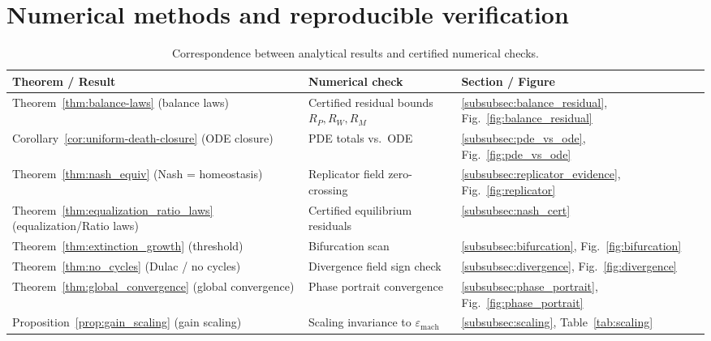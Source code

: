 \documentclass[pdflatex,sn-mathphys-ay]{sn-jnl}
\theoremstyle{thmstyleone}
\theoremstyle{definition}
\theoremstyle{remark}
\begin{document}
\section{Numerical methods and reproducible verification}
\label{sec:numerics}


\begin{table}[h]
\centering
\caption{Correspondence between analytical results and certified numerical checks.}
\label{tab:evidence_chain}
\begin{tabular}{lll}
\hline
\textbf{Theorem / Result} & \textbf{Numerical check} & \textbf{Section / Figure} \\
\hline
Theorem~\ref{thm:balance-laws} (balance laws) &
  Certified residual bounds $R_P,R_W,R_M$ &
  \ref{subsubsec:balance_residual}, Fig.~\ref{fig:balance_residual} \\
Corollary~\ref{cor:uniform-death-closure} (ODE closure) &
  PDE totals vs.\ ODE &
  \ref{subsubsec:pde_vs_ode}, Fig.~\ref{fig:pde_vs_ode} \\
Theorem~\ref{thm:nash_equiv} (Nash = homeostasis) &
  Replicator field zero-crossing &
  \ref{subsubsec:replicator_evidence}, Fig.~\ref{fig:replicator} \\
Theorem~\ref{thm:equalization_ratio_laws} (equalization/Ratio laws) &
  Certified equilibrium residuals &
  \ref{subsubsec:nash_cert} \\
Theorem~\ref{thm:extinction_growth} (threshold) &
  Bifurcation scan &
  \ref{subsubsec:bifurcation}, Fig.~\ref{fig:bifurcation} \\
Theorem~\ref{thm:no_cycles} (Dulac / no cycles) &
  Divergence field sign check &
  \ref{subsubsec:divergence}, Fig.~\ref{fig:divergence} \\
Theorem~\ref{thm:global_convergence} (global convergence) &
  Phase portrait convergence &
  \ref{subsubsec:phase_portrait}, Fig.~\ref{fig:phase_portrait} \\
Proposition~\ref{prop:gain_scaling} (gain scaling) &
  Scaling invariance to $\varepsilon_{\mathrm{mach}}$ &
  \ref{subsubsec:scaling}, Table~\ref{tab:scaling} \\
\hline
\end{tabular}
\end{table}
\end{document}

